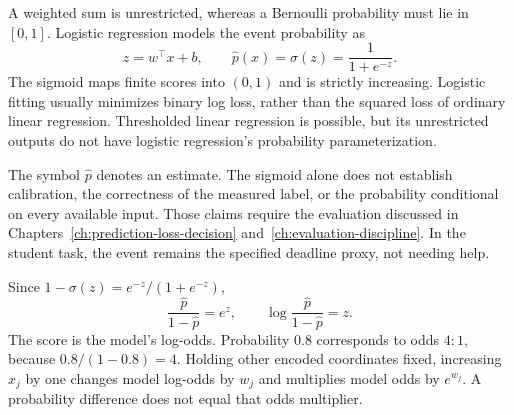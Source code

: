 A weighted sum is unrestricted, whereas a Bernoulli probability must lie in $[0,1]$. Logistic regression models the event probability as
\[
z=w^\top x+b,
\qquad
\hat p(x)=\sigma(z)=\frac1{1+e^{-z}}.
\]
The sigmoid maps finite scores into $(0,1)$ and is strictly increasing. Logistic fitting usually minimizes binary log loss, rather than the squared loss of ordinary linear regression. Thresholded linear regression is possible, but its unrestricted outputs do not have logistic regression's probability parameterization.

The symbol $\hat p$ denotes an estimate. The sigmoid alone does not establish calibration, the correctness of the measured label, or the probability conditional on every available input. Those claims require the evaluation discussed in Chapters~\ref{ch:prediction-loss-decision} and~\ref{ch:evaluation-discipline}. In the student task, the event remains the specified deadline proxy, not needing help.

Since $1-\sigma(z)=e^{-z}/(1+e^{-z})$,
\[
\frac{\hat p}{1-\hat p}=e^z,
\qquad
\log\frac{\hat p}{1-\hat p}=z.
\]
The score is the model's log-odds. Probability $0.8$ corresponds to odds $4{:}1$, because $0.8/(1-0.8)=4$. Holding other encoded coordinates fixed, increasing $x_j$ by one changes model log-odds by $w_j$ and multiplies model odds by $e^{w_j}$. A probability difference does not equal that odds multiplier.

\par\addvspace{\intextsep}\noindent\begin{minipage}{\linewidth}
\centering
{}
\label{fig:sigmoid-curve}
\end{minipage}\par\addvspace{\intextsep}


